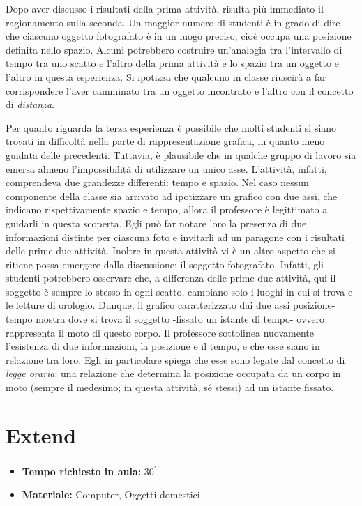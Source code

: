 \documentclass{report} \usepackage[T1]{fontenc} \usepackage[italian]{babel}
\begin{document}
Dopo aver discusso i risultati della prima attività, risulta più immediato il
ragionamento sulla seconda. Un maggior numero di studenti è in grado di dire
che ciascuno oggetto fotografato è in un luogo preciso, cioè occupa una
posizione definita nello spazio. Alcuni potrebbero costruire un’analogia tra
l’intervallo di tempo tra uno scatto e l’altro della prima attività e lo spazio
tra un oggetto e l’altro in questa esperienza. Si ipotizza che qualcuno in
classe riuscirà a far corrispondere l’aver camminato tra un oggetto incontrato
e l’altro con il concetto di \emph{distanza}.

Per quanto riguarda la terza esperienza è possibile che molti studenti si siano
trovati in difficoltà nella parte di rappresentazione grafica, in quanto meno
guidata delle precedenti. Tuttavia, è plausibile che in qualche gruppo di
lavoro sia emersa almeno l’impossibilità di utilizzare un unico asse.
L’attività, infatti, comprendeva due grandezze differenti: tempo e spazio.
Nel caso nessun componente della classe sia arrivato ad ipotizzare un grafico
con due assi, che indicano rispettivamente spazio e tempo, allora il professore
è legittimato a guidarli in questa scoperta. Egli può far notare loro la
presenza di due informazioni distinte per ciascuna foto e invitarli ad un
paragone con i risultati delle prime due attività.
Inoltre in questa attività vi è un altro aspetto che si ritiene possa emergere
dalla discussione: il soggetto fotografato. Infatti, gli studenti potrebbero
osservare che, a differenza delle prime due attività, qui il soggetto è sempre
lo stesso in ogni scatto, cambiano solo i luoghi in cui si trova e le letture
di orologio. Dunque, il grafico caratterizzato dai due assi posizione-tempo
mostra dove si trova il soggetto -fissato un istante di tempo- ovvero rappresenta
il moto di questo corpo. Il professore sottolinea nuovamente l’esistenza di
due informazioni, la posizione e il tempo, e che esse siano in relazione tra
loro. Egli in particolare spiega che esse sono legate dal concetto
di \emph{legge oraria}:  una relazione che determina la posizione occupata da un
corpo  in moto (sempre il medesimo; in questa attività, sé stessi) ad un istante
fissato.

\section{Extend}
\begin{itemize}
\item \textbf{Tempo richiesto in aula:} 30\textsuperscript{$\prime$}
\item \textbf{Materiale:} Computer, Oggetti domestici
\end{itemize}
\end{document}
